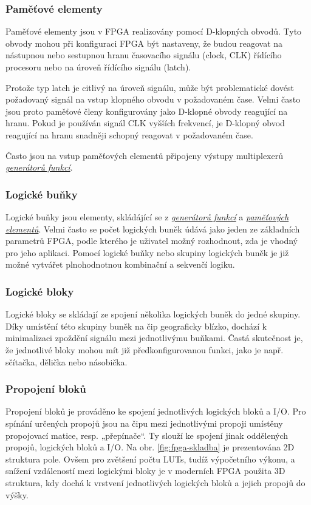 \documentclass[a4paper, twoside, 11pt]{article}
\begin{document}
	\subsubsection{Paměťové elementy}\label{subsubsec:pametove-elementy}
		Paměťové elementy jsou v FPGA realizovány pomocí D-klopných obvodů. Tyto obvody mohou při konfiguraci FPGA být nastaveny, že budou reagovat na nástupnou nebo sestupnou hranu časovacího signálu (clock, CLK) řídícího procesoru nebo na úroveň řídícího signálu (latch).\cite{Sass2010}\par
		Protože typ latch je citlivý na úroveň signálu, může být problematické dovést požadovaný signál na vstup klopného obvodu v požadovaném čase. Velmi často jsou proto paměťové členy konfigurovány jako D-klopné obvody reagující na hranu. Pokud je používán signál CLK vyšších frekvencí, je D-klopný obvod reagující na hranu snadněji schopný reagovat v požadovaném čase. \cite{Sass2010}\par
		Často jsou na vstup paměťových elementů připojeny výstupy multiplexerů \hyperref[subsubsec:generatory-funkci]{\textit{generátorů funkcí}}. \cite{Sass2010}

		\subsubsection{Logické buňky}
			Logické buňky jsou elementy, skládájící se z \hyperref[subsubsec:generatory-funkci]{\textit{generátorů funkcí}} a \hyperref[subsubsec:pametove-elementy]{\textit{paměťových elementů}}. Velmi často se počet logických buněk údává jako jeden ze základních parametrů FPGA, podle kterého je uživatel možný rozhodnout, zda je vhodný pro jeho aplikaci. Pomocí logické buňky nebo skupiny logických buněk je již možné vytvářet plnohodnotnou kombinační a sekvenčí logiku.\cite{Sass2010}

		\subsubsection{Logické bloky}\label{subsubsec:logicke-bloky}
			Logické bloky se skládají ze spojení několika logických buněk do jedné skupiny. Díky umístění této skupiny buněk na čip geograficky blízko, dochází k minimalizaci zpoždění signálu mezi jednotlivýmu buňkami. Častá skutečnost je, že jednotlivé bloky mohou mít již předkonfigurovanou funkci, jako je např. sčítačka, dělička nebo násobička. \cite{Sass2010}

		\subsubsection{Propojení bloků}
			Propojení bloků je prováděno ke spojení jednotlivých logických bloků a I/O. Pro spínání určených propojů jsou na čipu mezi jednotlivými propoji umístěny propojovací matice, resp. „přepínače“. Ty slouží ke spojení jinak oddělených propojů, logických bloků a I/O. \cite{Sass2010}
			Na obr. \ref{fig:fpga-skladba} je prezentována 2D struktura pole. Ovšem pro zvětšení počtu LUTs, tudíž výpočetního výkonu, a snížení vzdáleností mezi logickými bloky je v moderních FPGA použita 3D struktura, kdy dochá k vrstvení jednotlivých logických bloků a jejich propojů do výšky. \cite{pang-beginning-fpga}
\end{document}

